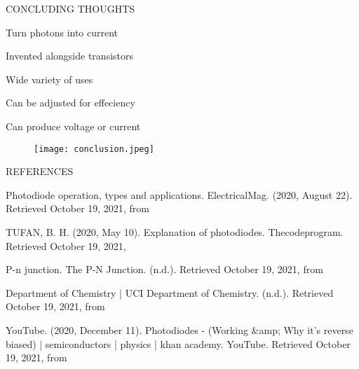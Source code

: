 \documentclass[14pt]{beamer}
\begin{document}
\begin{frame}{CONCLUDING THOUGHTS}
	
			\begin{flushleft}
		\begin{list}{--}{}
			\item Turn photons into current
			\item Invented alongside transistors
			\item Wide variety of uses
			\item Can be adjusted for effeciency
			\item Can produce voltage or current
		\end{list}
	\end{flushleft}	
	
		\begin{figure}[H]
		\begin{flushleft}
			\texttt{[image: conclusion.jpeg]}
		\end{flushleft}
	\end{figure}
	
\end{frame}



\begin{frame}{REFERENCES}
	
	\begin{flushleft}
		\begin{list}{--}{}
			
	\item \scriptsize{Photodiode operation, types and applications. ElectricalMag. (2020, August 22). Retrieved October 19, 2021, from \color{blue}{https://electricalmag.com/photodiode/. }}
	
	\item \scriptsize{TUFAN, B. H. (2020, May 10). Explanation of photodiodes. Thecodeprogram. Retrieved October 19, 2021, \color{blue}{from https://thecodeprogram.com/explanation-of-photodiodes. }}
	
	\item \scriptsize{P-n junction. The P-N Junction. (n.d.). Retrieved October 19, 2021, from \color{blue}{http://hyperphysics.phy-astr.gsu.edu/hbase/Solids/pnjun.html. }}
	
	\item \scriptsize{Department of Chemistry | UCI Department of Chemistry. (n.d.). Retrieved October 19, 2021, from \color{blue}{https://www.chem.uci.edu/~unicorn/243/handouts/photodiode.pdf. }}
	
	\item \scriptsize{YouTube. (2020, December 11). Photodiodes - (Working \&amp; Why it's reverse biased) | semiconductors | physics | khan academy. YouTube. Retrieved October 19, 2021, from \color{blue}{https://www.youtube.com/watch?v=KgKcbW77txY. } }
	
	\vspace{10mm}
	\end{list}
	\end{flushleft}
\end{frame}
\end{document}
